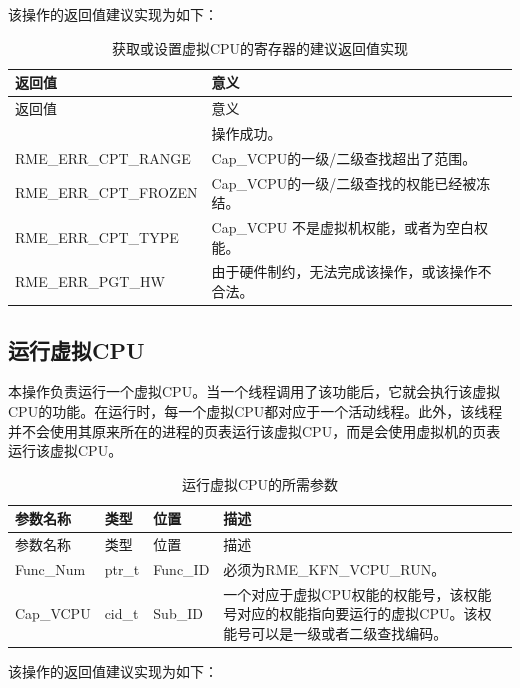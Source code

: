 该操作的返回值建议实现为如下：

\begin{xltabular}{\textwidth}{@{}>{\hsize\raggedright\arraybackslash}X>{\hsize\raggedright\arraybackslash}X@{}}
\caption{获取或设置虚拟CPU的寄存器的建议返回值实现}\label{tab:8-90-get-or-set-virtual-cpu-registers-suggested-return-values}\\
\toprule
返回值 & 意义\tabularnewline
\endfirsthead
\toprule
返回值 & 意义\tabularnewline
\midrule
\endhead
\bottomrule
{} & 操作成功。\tabularnewline
    RME\_ERR\_CPT\_RANGE & Cap\_VCPU的一级/二级查找超出了范围。\tabularnewline
    RME\_ERR\_CPT\_FROZEN & Cap\_VCPU的一级/二级查找的权能已经被冻结。\tabularnewline
    RME\_ERR\_CPT\_TYPE & Cap\_VCPU 不是虚拟机权能，或者为空白权能。\tabularnewline
    
    RME\_ERR\_PGT\_HW & 由于硬件制约，无法完成该操作，或该操作不合法。\tabularnewline
\end{xltabular}

\subsection{运行虚拟CPU}\label{subsec:8-run-virtual-cpu}

本操作负责运行一个虚拟CPU。当一个线程调用了该功能后，它就会执行该虚拟CPU的功能。在运行时，每一个虚拟CPU都对应于一个活动线程。此外，该线程并不会使用其原来所在的进程的页表运行该虚拟CPU，而是会使用虚拟机的页表运行该虚拟CPU。

\begin{xltabular}{\textwidth}{@{}>{\hsize\raggedright\arraybackslash}X>{\hsize\raggedright\arraybackslash}X>{\hsize\raggedright\arraybackslash}X>{\hsize\raggedright\arraybackslash}X@{}}
\caption{运行虚拟CPU的所需参数}\label{tab:8-91-run-virtual-cpu-parameters}\\
\toprule
参数名称 & 类型 & 位置 & 描述\tabularnewline
\endfirsthead
\toprule
参数名称 & 类型 & 位置 & 描述\tabularnewline
\midrule
\endhead
\bottomrule
\endlastfoot
Func\_Num & ptr\_t & Func\_ID &
必须为RME\_KFN\_VCPU\_RUN。\tabularnewline
Cap\_VCPU & cid\_t & Sub\_ID &
一个对应于虚拟CPU权能的权能号，该权能号对应的权能指向要运行的虚拟CPU。该权能号可以是一级或者二级查找编码。\tabularnewline
\end{xltabular}

该操作的返回值建议实现为如下：

